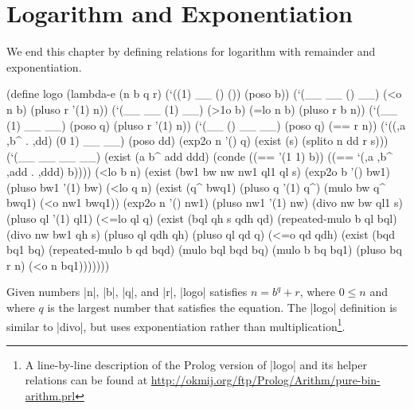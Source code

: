 \section{Logarithm and Exponentiation}\label{arithexplog}

We end this chapter by defining relations for logarithm with remainder
and exponentiation.

\newpage

\begin{schemedisplay}
(define logo
  (lambda-e (n b q r)
    (`((1) __ () ()) (poso b))
    (`(__ __ () __) (<o n b) (pluso r '(1) n))
    (`(__ __ (1) __) (>1o b) (=lo n b) (pluso r b n))
    (`(__ (1) __ __) (poso q) (pluso r '(1) n))
    (`(__ () __ __) (poso q) (== r n))
    (`((,a ,b^ . ,dd) (0 1) __ __) (poso dd)
     (exp2o n '() q)
     (exist (s) (splito n dd r s)))
    (`(__ __ __ __)
     (exist (a b^ add ddd)
       (conde
         ((== '(1 1) b))
         ((== `(,a ,b^ ,add . ,ddd) b))))
     (<lo b n)
     (exist (bw1 bw nw nw1 ql1 ql s)
       (exp2o b '() bw1)
       (pluso bw1 '(1) bw)
       (<lo q n)
       (exist (q^ bwq1)
         (pluso q '(1) q^)
         (mulo bw q^ bwq1)
         (<o nw1 bwq1))
       (exp2o n '() nw1)
       (pluso nw1 '(1) nw)
       (divo nw bw ql1 s)
       (pluso ql '(1) ql1)
       (<=lo ql q)
       (exist (bql qh s qdh qd)
         (repeated-mulo b ql bql)
         (divo nw bw1 qh s)
         (pluso ql qdh qh)
         (pluso ql qd q)
         (<=o qd qdh)
         (exist (bqd bq1 bq)
           (repeated-mulo b qd bqd)
           (mulo bql bqd bq)
           (mulo b bq bq1)
           (pluso bq r n)
           (<o n bq1)))))))
\end{schemedisplay}

Given numbers \scheme|n|, \scheme|b|, \scheme|q|, and \scheme|r|,
\scheme|logo| satisfies $n = b^q + r$, where $0 \leq n$ and where $q$
is the largest number that satisfies the equation.  The \scheme|logo|
definition is similar to \scheme|divo|, but uses exponentiation rather
than multiplication\footnote{A line-by-line description of the Prolog
version of \scheme|logo| and its helper relations can be found at
\url{http://okmij.org/ftp/Prolog/Arithm/pure-bin-arithm.prl}}.

%

